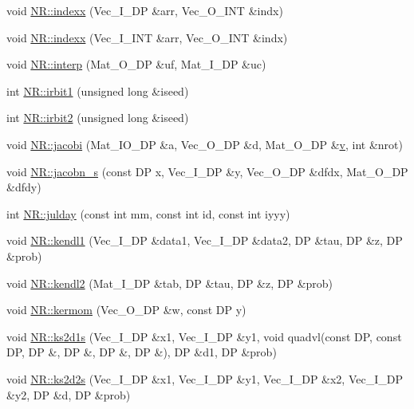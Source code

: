\begin{DoxyCompactItemize}
\item 
void \mbox{\hyperlink{namespaceNR_a16cc62d4d994e6557e4d85d1b5de0ff9}{N\+R\+::indexx}} (Vec\+\_\+\+I\+\_\+\+DP \&arr, Vec\+\_\+\+O\+\_\+\+I\+NT \&indx)
\item 
void \mbox{\hyperlink{namespaceNR_ab3cd4fa2aeff189dee20cd3f87378212}{N\+R\+::indexx}} (Vec\+\_\+\+I\+\_\+\+I\+NT \&arr, Vec\+\_\+\+O\+\_\+\+I\+NT \&indx)
\item 
void \mbox{\hyperlink{namespaceNR_af65d3c7d1b9eddb10dd001e6456ea45a}{N\+R\+::interp}} (Mat\+\_\+\+O\+\_\+\+DP \&uf, Mat\+\_\+\+I\+\_\+\+DP \&uc)
\item 
int \mbox{\hyperlink{namespaceNR_a8847cb5906daead1ccf717166c61b0d7}{N\+R\+::irbit1}} (unsigned long \&iseed)
\item 
int \mbox{\hyperlink{namespaceNR_a826f4788e674ad205145876a7ddd04e0}{N\+R\+::irbit2}} (unsigned long \&iseed)
\item 
void \mbox{\hyperlink{namespaceNR_ab9427d0f2503bbbc8a531c2e06f9369e}{N\+R\+::jacobi}} (Mat\+\_\+\+I\+O\+\_\+\+DP \&a, Vec\+\_\+\+O\+\_\+\+DP \&d, Mat\+\_\+\+O\+\_\+\+DP \&\mbox{\hyperlink{adat__devel_2lib_2hadron_2hadron__timeslice_8cc_a716fc87f5e814be3ceee2405ed6ff22a}{v}}, int \&nrot)
\item 
void \mbox{\hyperlink{namespaceNR_a98c0d038f8153db652155a23d8fca0c5}{N\+R\+::jacobn\+\_\+s}} (const DP x, Vec\+\_\+\+I\+\_\+\+DP \&y, Vec\+\_\+\+O\+\_\+\+DP \&dfdx, Mat\+\_\+\+O\+\_\+\+DP \&dfdy)
\item 
int \mbox{\hyperlink{namespaceNR_adcf22e2f352f18973efcc6a828196a69}{N\+R\+::julday}} (const int mm, const int id, const int iyyy)
\item 
void \mbox{\hyperlink{namespaceNR_a0cbcf6c9ade0e1df0bb132f18485ad14}{N\+R\+::kendl1}} (Vec\+\_\+\+I\+\_\+\+DP \&data1, Vec\+\_\+\+I\+\_\+\+DP \&data2, DP \&tau, DP \&z, DP \&prob)
\item 
void \mbox{\hyperlink{namespaceNR_ad2ded25f5e4aef7460de829455ece1f2}{N\+R\+::kendl2}} (Mat\+\_\+\+I\+\_\+\+DP \&tab, DP \&tau, DP \&z, DP \&prob)
\item 
void \mbox{\hyperlink{namespaceNR_a0cbc2daad62a102dd3359715e4b1bc70}{N\+R\+::kermom}} (Vec\+\_\+\+O\+\_\+\+DP \&w, const DP y)
\item 
void \mbox{\hyperlink{namespaceNR_a4ed85372a28396e39da6c7f899dd0c82}{N\+R\+::ks2d1s}} (Vec\+\_\+\+I\+\_\+\+DP \&x1, Vec\+\_\+\+I\+\_\+\+DP \&y1, void quadvl(const DP, const DP, DP \&, DP \&, DP \&, DP \&), DP \&d1, DP \&prob)
\item 
void \mbox{\hyperlink{namespaceNR_a2b2c455972d6a6fed97ba9b9abbcab3f}{N\+R\+::ks2d2s}} (Vec\+\_\+\+I\+\_\+\+DP \&x1, Vec\+\_\+\+I\+\_\+\+DP \&y1, Vec\+\_\+\+I\+\_\+\+DP \&x2, Vec\+\_\+\+I\+\_\+\+DP \&y2, DP \&d, DP \&prob)

\end{DoxyCompactItemize}
